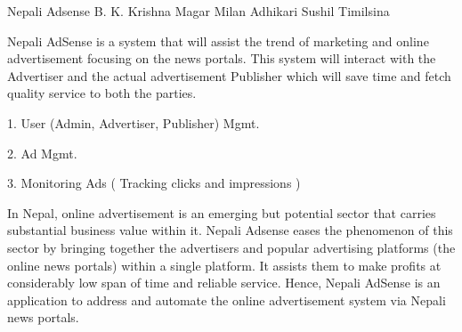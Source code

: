  \begin{conf-abstract}[]
 {Nepali Adsense}
 {B. K. Krishna Magar
 	Milan Adhikari
 	Sushil Timilsina
 }
{}

Nepali AdSense is a system that will assist the trend of marketing and online advertisement focusing on the news portals. This system will interact with the Advertiser and the actual advertisement Publisher which will save time and fetch quality service to both the parties.

1. User (Admin, Advertiser, Publisher) Mgmt.

2. Ad Mgmt.

3. Monitoring Ads ( Tracking clicks and impressions )

In Nepal, online advertisement is an emerging but potential sector that carries substantial business value within it. Nepali Adsense eases the phenomenon of this sector by bringing together the advertisers and popular advertising platforms (the online news portals) within a single platform. It assists them to make profits at considerably low span of time and reliable service. Hence, Nepali AdSense is an application to address and automate the online advertisement system via Nepali news portals.

 \end{conf-abstract}